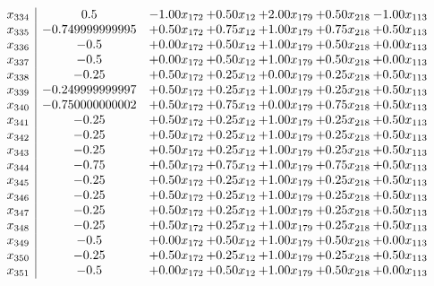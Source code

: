 \documentclass[8pt]{article}
\begin{document}
\[\begin{array}{c| c c@{\hskip 2pt} c@{\hskip 2pt} c@{\hskip 2pt} c@{\hskip 2pt} c@{\hskip 2pt} }
 x_{334}   &  0.5 & -1.00 x_{172} & +  0.50 x_{12} & +  2.00 x_{179} & +  0.50 x_{218} & -1.00 x_{113}\\
 x_{335}   &  -0.749999999995 & +  0.50 x_{172} & +  0.75 x_{12} & +  1.00 x_{179} & +  0.75 x_{218} & +  0.50 x_{113}\\
 x_{336}   &  -0.5 & +  0.00 x_{172} & +  0.50 x_{12} & +  1.00 x_{179} & +  0.50 x_{218} & +  0.00 x_{113}\\
 x_{337}   &  -0.5 & +  0.00 x_{172} & +  0.50 x_{12} & +  1.00 x_{179} & +  0.50 x_{218} & +  0.00 x_{113}\\
 x_{338}   &  -0.25 & +  0.50 x_{172} & +  0.25 x_{12} & +  0.00 x_{179} & +  0.25 x_{218} & +  0.50 x_{113}\\
 x_{339}   &  -0.249999999997 & +  0.50 x_{172} & +  0.25 x_{12} & +  1.00 x_{179} & +  0.25 x_{218} & +  0.50 x_{113}\\
 x_{340}   &  -0.750000000002 & +  0.50 x_{172} & +  0.75 x_{12} & +  0.00 x_{179} & +  0.75 x_{218} & +  0.50 x_{113}\\
 x_{341}   &  -0.25 & +  0.50 x_{172} & +  0.25 x_{12} & +  1.00 x_{179} & +  0.25 x_{218} & +  0.50 x_{113}\\
 x_{342}   &  -0.25 & +  0.50 x_{172} & +  0.25 x_{12} & +  1.00 x_{179} & +  0.25 x_{218} & +  0.50 x_{113}\\
 x_{343}   &  -0.25 & +  0.50 x_{172} & +  0.25 x_{12} & +  1.00 x_{179} & +  0.25 x_{218} & +  0.50 x_{113}\\
 x_{344}   &  -0.75 & +  0.50 x_{172} & +  0.75 x_{12} & +  1.00 x_{179} & +  0.75 x_{218} & +  0.50 x_{113}\\
 x_{345}   &  -0.25 & +  0.50 x_{172} & +  0.25 x_{12} & +  1.00 x_{179} & +  0.25 x_{218} & +  0.50 x_{113}\\
 x_{346}   &  -0.25 & +  0.50 x_{172} & +  0.25 x_{12} & +  1.00 x_{179} & +  0.25 x_{218} & +  0.50 x_{113}\\
 x_{347}   &  -0.25 & +  0.50 x_{172} & +  0.25 x_{12} & +  1.00 x_{179} & +  0.25 x_{218} & +  0.50 x_{113}\\
 x_{348}   &  -0.25 & +  0.50 x_{172} & +  0.25 x_{12} & +  1.00 x_{179} & +  0.25 x_{218} & +  0.50 x_{113}\\
 x_{349}   &  -0.5 & +  0.00 x_{172} & +  0.50 x_{12} & +  1.00 x_{179} & +  0.50 x_{218} & +  0.00 x_{113}\\
 x_{350}   &  -0.25 & +  0.50 x_{172} & +  0.25 x_{12} & +  1.00 x_{179} & +  0.25 x_{218} & +  0.50 x_{113}\\
 x_{351}   &  -0.5 & +  0.00 x_{172} & +  0.50 x_{12} & +  1.00 x_{179} & +  0.50 x_{218} & +  0.00 x_{113}\\

\end{array}\]
\end{document}
